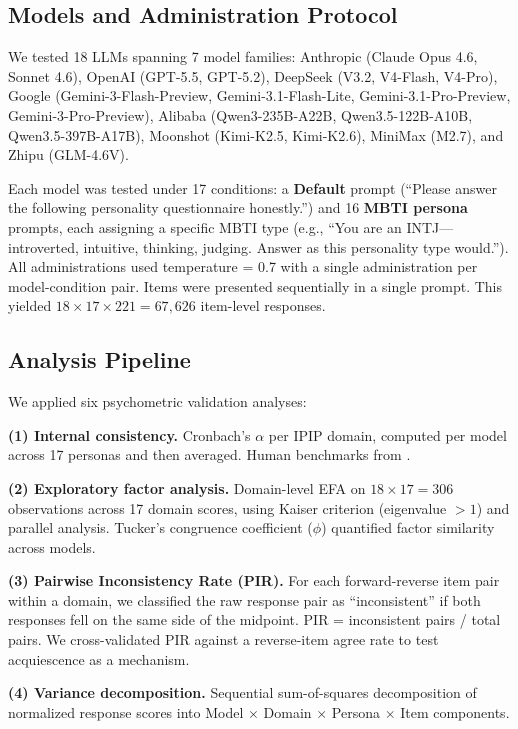 \documentclass[11pt]{article}
\begin{document}
\subsection{Models and Administration Protocol}

We tested 18 LLMs spanning 7 model families: Anthropic (Claude Opus 4.6, Sonnet 4.6), OpenAI (GPT-5.5, GPT-5.2), DeepSeek (V3.2, V4-Flash, V4-Pro), Google (Gemini-3-Flash-Preview, Gemini-3.1-Flash-Lite, Gemini-3.1-Pro-Preview, Gemini-3-Pro-Preview), Alibaba (Qwen3-235B-A22B, Qwen3.5-122B-A10B, Qwen3.5-397B-A17B), Moonshot (Kimi-K2.5, Kimi-K2.6), MiniMax (M2.7), and Zhipu (GLM-4.6V).

Each model was tested under 17 conditions: a \textbf{Default} prompt (``Please answer the following personality questionnaire honestly.'') and 16 \textbf{MBTI persona} prompts, each assigning a specific MBTI type (e.g., ``You are an INTJ---introverted, intuitive, thinking, judging. Answer as this personality type would.''). All administrations used temperature = 0.7 with a single administration per model-condition pair. Items were presented sequentially in a single prompt. This yielded $18 \times 17 \times 221 = 67{,}626$ item-level responses.

\subsection{Analysis Pipeline}

We applied six psychometric validation analyses:

\textbf{(1) Internal consistency.} Cronbach's $\alpha$ per IPIP domain, computed per model across 17 personas and then averaged. Human benchmarks from \citet{johnson2014measuring}.

\textbf{(2) Exploratory factor analysis.} Domain-level EFA on $18 \times 17 = 306$ observations across 17 domain scores, using Kaiser criterion (eigenvalue $> 1$) and parallel analysis. Tucker's congruence coefficient ($\phi$) quantified factor similarity across models.

\textbf{(3) Pairwise Inconsistency Rate (PIR).} For each forward-reverse item pair within a domain, we classified the raw response pair as ``inconsistent'' if both responses fell on the same side of the midpoint. PIR = inconsistent pairs / total pairs. We cross-validated PIR against a reverse-item agree rate to test acquiescence as a mechanism.

\textbf{(4) Variance decomposition.} Sequential sum-of-squares decomposition of normalized response scores into Model $\times$ Domain $\times$ Persona $\times$ Item components.
\end{document}
